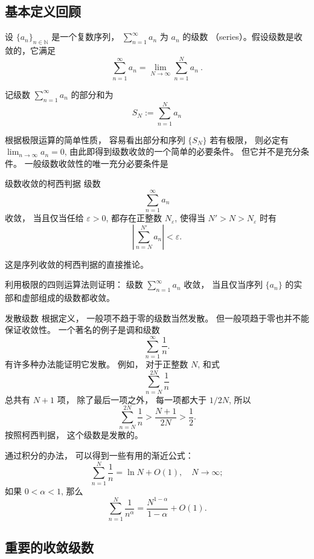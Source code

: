 

\subsection{基本定义回顾}


设 $\{a_n\}_{n\in\mathbb{N}}$ 是一个复数序列， $\sum_{n=1}^\infty a_n$ 为 $a_n$ 的级数 （series）。假设级数是收敛的，它满足
$$
\sum_{n=1}^\infty a_n = \lim_{N \to \infty} \sum_{n=1}^N a_n~.
$$

记级数 $\sum_{n=1}^\infty a_n$ 的部分和为
\[
S_N := \sum_{n=1}^N a_n
\]

根据极限运算的简单性质， 容易看出部分和序列 $\{S_N\}$ 若有极限， 则必定有 $\lim_{n\to\infty}a_n=0$, 由此即得到级数收敛的一个简单的必要条件。 但它并不是充分条件。 一般级数收敛性的唯一充分必要条件是
\begin{theorem}{级数收敛的柯西判据}
级数
\[
\sum_{n=1}^\infty a_n
\]
收敛， 当且仅当任给 $\varepsilon>0$, 都存在正整数 $N_\varepsilon$, 使得当 $N'>N>N_\varepsilon$ 时有
$$
\left|\sum_{n=N}^{N'} a_n\right|<\varepsilon.
$$
\end{theorem}
这是序列收敛的柯西判据的直接推论。

\begin{exercise}{}
利用极限的四则运算法则证明： 级数 $\sum_{n=1}^\infty a_n$ 收敛， 当且仅当序列 $\{a_n\}$ 的实部和虚部组成的级数都收敛。
\end{exercise}

\begin{example}{发散级数}
根据定义， 一般项不趋于零的级数当然发散。 但一般项趋于零也并不能保证收敛性。 一个著名的例子是调和级数
$$
\sum_{n=1}^\infty\frac{1}{n}.
$$
有许多种办法能证明它发散。 例如， 对于正整数 $N$, 和式
$$
\sum_{n=N}^{2N}\frac{1}{n}
$$
总共有 $N+1$ 项， 除了最后一项之外， 每一项都大于 $1/2N$, 所以
$$
\sum_{n=N}^{2N}\frac{1}{n}>\frac{N+1}{2N}>\frac{1}{2}.
$$
按照柯西判据， 这个级数是发散的。

通过积分的办法， 可以得到一些有用的渐近公式：
$$
\sum_{n=1}^{N}\frac{1}{n}=\ln N+O(1),\quad N\to\infty;
$$
如果 $0<\alpha<1$, 那么
$$
\sum_{n=1}^{N}\frac{1}{n^\alpha}=\frac{N^{1-\alpha}}{1-\alpha}+O(1).
$$
\end{example}

\subsection{重要的收敛级数}

